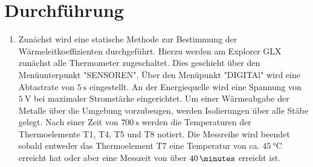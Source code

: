 
\section{Durchführung}
\label{sec:Durchführung}

\renewcommand{\labelenumi}{\alph{enumi})}
\begin{enumerate}
  \item Zunächst wird eine statische Methode zur Bestimmung der Wärmeleitkoeffizienten
  durchgeführt. Hierzu werden am Explorer GLX zunächst alle Thermometer zugeschaltet.
  Dies geschieht über den Menüunterpunkt "SENSOREN". Über den Menüpunkt "DIGITAl"
   wird eine Abtastrate von $\SI{5}{\second}$ eingestellt. An der Energiequelle wird
    eine Spannung von $\SI{5}{\volt}$ bei maximaler Stromstärke eingerichtet. Um
     einer Wärmeabgabe der Metalle über die Umgebung vorzubeugen, werden
     Isolierungen über alle Stäbe gelegt. Nach einer Zeit von $\SI{700}{\second}$
     werden die Temperaturen der Thermoelemente T1, T4, T5 und T8 notiert. Die Messreihe
      wird beendet sobald entweder das Thermoelement T7 eine Temperatur von ca.
       $\SI{45}{\degreeCelsius}$ erreicht hat oder aber eine Messzeit von über $\SI{40}{\minutes}$ erreicht ist.
\end{enumerate}
